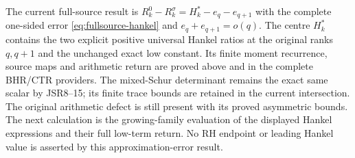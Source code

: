 The current full-source result is
$R_k^0-R_k^\sigma=H_k^*-e_q-e_{q+1}$ with the complete
one-sided error \eqref{eq:fullsource-hankel} and
$e_q+e_{q+1}=o(q)$. The centre $H_k^*$ contains the two
explicit positive universal Hankel ratios at the original
ranks $q,q+1$ and the unchanged exact low constant.
Its finite moment recurrence, source maps and arithmetic
return are proved above and in the complete BHR/CTR providers.
The mixed-Schur determinant remains the exact same scalar
by JSR8--15; its finite trace bounds are retained in the
current intersection. The original arithmetic defect
is still present with its proved asymmetric bounds.
The next calculation is the growing-family evaluation of
the displayed Hankel expressions and their full low-term
return. No RH endpoint or leading Hankel value is asserted
by this approximation-error result.